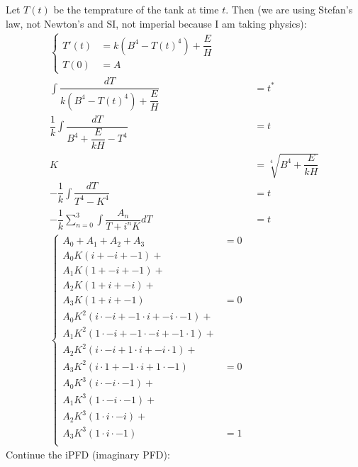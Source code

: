 \documentclass[11pt]{article}
\begin{document}
    \begin{solution*}
        Let $T(t)$ be the temprature of the tank at time $t$. Then (we are using Stefan's law, not Newton's and SI, not imperial because I am taking physics):
        \begin{align}
            \begin{cases}
                T'(t) &= k(B^4-T(t)^4) + \dfrac{E}{H} \\ 
                T(0) &= A
            \end{cases}& \\
            \int \dfrac{dT}{k(B^4 - T(t)^4) + \dfrac{E}{H}} &= t^{*} \\
            \dfrac{1}{k} \int \dfrac{dT}{B^4 + \dfrac{E}{kH} - T^4} &= t \\ 
            K &= \sqrt[4]{B^4 + \dfrac{E}{kH}} \\ 
            -\dfrac{1}{k} \int \dfrac{dT}{T^4-K^4} &= t \\ 
            -\dfrac{1}{k} \sum_{n=0}^3 \int \dfrac{A_n}{T + i^nK}dT &= t \\
            \begin{cases}
                A_0 + A_1 + A_2 + A_3 &= 0 \\ 
                A_0K(i + -i + -1) + \\ 
                A_1K(1 + -i + -1) + \\ 
                A_2K(1 + i  + -i) + \\
                A_3K(1 + i  + -1) &= 0 \\
                A_0K^2(i\cdot-i + -1 \cdot i  + -i \cdot -1) + \\
                A_1K^2(1\cdot-i + -1 \cdot -i + -1 \cdot 1) + \\ 
                A_2K^2(i\cdot-i + 1  \cdot i  + -i \cdot 1) + \\ 
                A_3K^2(i\cdot 1 + -1 \cdot i  + 1 \cdot -1) &= 0 \\
                A_0K^3(i \cdot -i \cdot -1) + \\ 
                A_1K^3(1 \cdot -i \cdot -1) + \\ 
                A_2K^3(1 \cdot i \cdot -i)  + \\ 
                A_3K^3(1 \cdot i \cdot -1) &= 1 \\
            \end{cases}
        \end{align}
        Continue the iPFD (imaginary PFD):
        \begin{align}

\end{align}
\end{solution*}
\end{document}
